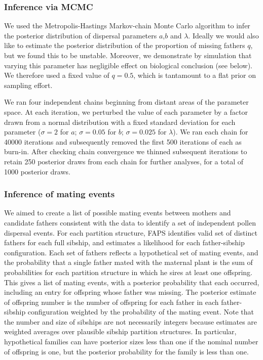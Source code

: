 \documentclass[10pt, a4paper, twocolumn]{article} %
\begin{document}
\subsubsection{Inference via MCMC}

We used the Metropolis-Hastings Markov-chain Monte Carlo algorithm to infer the posterior distribution of dispersal parameters $a$,$b$ and $\lambda$.
Ideally we would also like to estimate the posterior distribution of the proportion of missing fathers $q$, but we found this to be unstable.
Moreover, we demonstrate by simulation that varying this parameter has negligible effect on biological conclusion (see below).
We therefore used a fixed value of $q=0.5$, which is tantamount to a flat prior on sampling effort. 

We ran four independent chains beginning from distant areas of the parameter space.
At each iteration, we perturbed the value of each parameter by a factor drawn from a normal distribution with a fixed standard deviation for each parameter ($\sigma= 2$ for $a$; $\sigma= 0.05$ for $b$; $\sigma= 0.025$ for $\lambda$).
We ran each chain for 40000 iterations and subsequently removed the first 500 iterations of each as burn-in.
After checking chain convergence we thinned subsequent iterations to retain 250 posterior draws from each chain for further analyses, for a total of 1000 posterior draws.

\subsubsection{Inference of mating events}

We aimed to create a list of possible mating events between mothers and candidate fathers consistent with the data to identify a set of independent pollen dispersal events.
For each partition structure, FAPS identifies valid set of distinct fathers for each full sibship, and estimates a likelihood for each father-sibship configuration.
Each set of fathers reflects a hypothetical set of mating events, and the probability that a single father mated with the maternal plant is the sum of probabilities for each partition structure in which he sires at least one offspring.
This gives a list of mating events, with a posterior probability that each occurred, including an entry for offspring whose father was missing.
The posterior estimate of offspring number is the number of offspring for each father in each father-sibship configuration weighted by the probability of the mating event.
Note that the number and size of sibships are not necessarily integers because estimates are weighted averages over plausible sibship partition structures.
In particular, hypothetical families can have posterior sizes less than one if the nominal number of offspring is one, but the posterior probability for the family is less than one.
\end{document}
